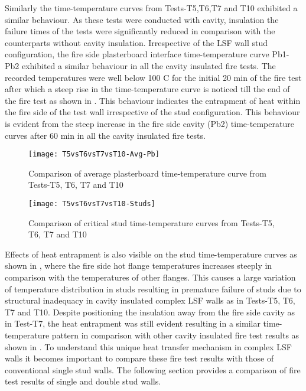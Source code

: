 Similarly the time-temperature curves from Tests-T5,T6,T7 and T10 exhibited a similar behaviour. As these tests were conducted with cavity, insulation the failure times of the tests were significantly reduced in comparison with the counterparts without cavity insulation. Irrespective of the LSF wall stud configuration, the fire side plasterboard interface time-temperature curve Pb1-Pb2 exhibited a similar behaviour in all the cavity insulated fire tests. The recorded temperatures were well below 100 \degree C for the initial 20 min of the fire test after which a steep rise in the time-temperature curve is noticed till the end of the fire test as shown in . This behaviour indicates the entrapment of heat within the fire side of the test wall irrespective of the stud configuration. This behaviour is evident from the steep increase in the fire side cavity (Pb2) time-temperature curves after 60 min in all the cavity insulated fire tests.  
\begin{figure}[!htbp]
	\centering
		\texttt{[image: T5vsT6vsT7vsT10-Avg-Pb]}  
	\caption{Comparison of average plasterboard time-temperature curve from Tests-T5, T6, T7 and T10}
	\label{fig:T5vsT6vsT7vsT10-Avg-Pb}
\end{figure}
\begin{figure}[!htbp]
	\centering
		\texttt{[image: T5vsT6vsT7vsT10-Studs]}  
	\caption{Comparison of critical stud time-temperature curves from Tests-T5, T6, T7 and T10}
	\label{fig:T5vsT6vsT7vsT10-Studs}
\end{figure} 

Effects of heat entrapment is also visible on the stud time-temperature curves as shown in , where the fire side hot flange temperatures increases steeply in comparison with the temperatures of other flanges. This causes a large variation of temperature distribution in studs resulting in premature failure of studs due to structural inadequacy in cavity insulated complex LSF walls as in Tests-T5, T6, T7 and T10. Despite positioning the insulation away from the fire side cavity as in Test-T7, the heat entrapment was still evident resulting in a similar time-temperature pattern in comparison with other cavity insulated fire test results as shown in . To understand this unique heat transfer mechanism in complex LSF walls it becomes important to compare these fire test results with those of conventional single stud walls. The following section provides a comparison of fire test results of single and double stud walls.

